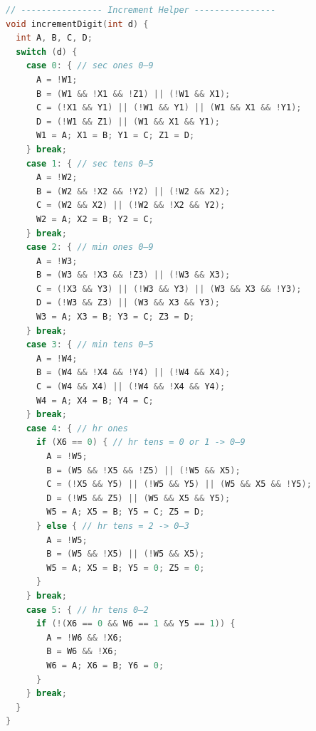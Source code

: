 \documentclass{article}
\begin{document}
\begin{lstlisting}[language=C++]
// ---------------- Increment Helper ----------------
void incrementDigit(int d) {
  int A, B, C, D;
  switch (d) {
    case 0: { // sec ones 0–9
      A = !W1;
      B = (W1 && !X1 && !Z1) || (!W1 && X1);
      C = (!X1 && Y1) || (!W1 && Y1) || (W1 && X1 && !Y1);
      D = (!W1 && Z1) || (W1 && X1 && Y1);
      W1 = A; X1 = B; Y1 = C; Z1 = D;
    } break;
    case 1: { // sec tens 0–5
      A = !W2;
      B = (W2 && !X2 && !Y2) || (!W2 && X2);
      C = (W2 && X2) || (!W2 && !X2 && Y2);
      W2 = A; X2 = B; Y2 = C;
    } break;
    case 2: { // min ones 0–9
      A = !W3;
      B = (W3 && !X3 && !Z3) || (!W3 && X3);
      C = (!X3 && Y3) || (!W3 && Y3) || (W3 && X3 && !Y3);
      D = (!W3 && Z3) || (W3 && X3 && Y3);
      W3 = A; X3 = B; Y3 = C; Z3 = D;
    } break;
    case 3: { // min tens 0–5
      A = !W4;
      B = (W4 && !X4 && !Y4) || (!W4 && X4);
      C = (W4 && X4) || (!W4 && !X4 && Y4);
      W4 = A; X4 = B; Y4 = C;
    } break;
    case 4: { // hr ones
      if (X6 == 0) { // hr tens = 0 or 1 -> 0–9
        A = !W5;
        B = (W5 && !X5 && !Z5) || (!W5 && X5);
        C = (!X5 && Y5) || (!W5 && Y5) || (W5 && X5 && !Y5);
        D = (!W5 && Z5) || (W5 && X5 && Y5);
        W5 = A; X5 = B; Y5 = C; Z5 = D;
      } else { // hr tens = 2 -> 0–3
        A = !W5;
        B = (W5 && !X5) || (!W5 && X5);
        W5 = A; X5 = B; Y5 = 0; Z5 = 0;
      }
    } break;
    case 5: { // hr tens 0–2
      if (!(X6 == 0 && W6 == 1 && Y5 == 1)) {
        A = !W6 && !X6;
        B = W6 && !X6;
        W6 = A; X6 = B; Y6 = 0;
      }
    } break;
  }
}


\end{lstlisting}
\end{document}
